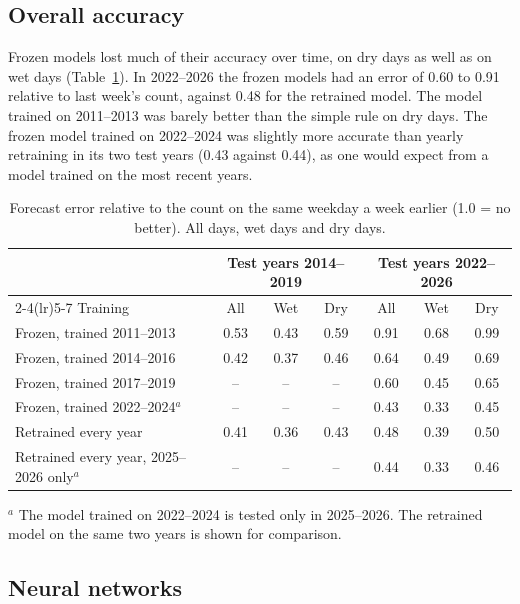 \documentclass[preprint,12pt,authoryear]{elsarticle}
\begin{document}
\subsection{Overall accuracy}

Frozen models lost much of their accuracy over time, on dry days as well as on wet days (Table~\ref{tab:acc}). In 2022--2026 the frozen models had an error of 0.60 to 0.91 relative to last week's count, against 0.48 for the retrained model. The model trained on 2011--2013 was barely better than the simple rule on dry days. The frozen model trained on 2022--2024 was slightly more accurate than yearly retraining in its two test years (0.43 against 0.44), as one would expect from a model trained on the most recent years.

\begin{table}[!htbp]
\centering
\caption{Forecast error relative to the count on the same weekday a week earlier (1.0 = no better). All days, wet days and dry days.}
\label{tab:acc}
\footnotesize
\setlength{\tabcolsep}{4pt}
\begin{tabular}{@{}lcccccc@{}}
\toprule
 & \multicolumn{3}{c}{Test years 2014--2019} & \multicolumn{3}{c}{Test years 2022--2026} \\
\cmidrule(lr){2-4}\cmidrule(lr){5-7}
Training & All & Wet & Dry & All & Wet & Dry \\
\midrule
Frozen, trained 2011--2013 & 0.53 & 0.43 & 0.59 & 0.91 & 0.68 & 0.99 \\
Frozen, trained 2014--2016 & 0.42 & 0.37 & 0.46 & 0.64 & 0.49 & 0.69 \\
Frozen, trained 2017--2019 & -- & -- & -- & 0.60 & 0.45 & 0.65 \\
Frozen, trained 2022--2024$^{a}$ & -- & -- & -- & 0.43 & 0.33 & 0.45 \\
Retrained every year & 0.41 & 0.36 & 0.43 & 0.48 & 0.39 & 0.50 \\
Retrained every year, 2025--2026 only$^{a}$ & -- & -- & -- & 0.44 & 0.33 & 0.46 \\
\bottomrule
\end{tabular}

\smallskip
\footnotesize $^{a}$ The model trained on 2022--2024 is tested only in 2025--2026. The retrained model on the same two years is shown for comparison.
\end{table}

\subsection{Neural networks}
\end{document}
